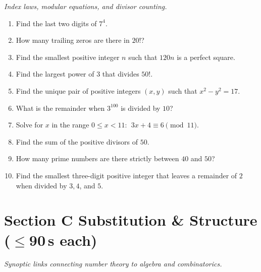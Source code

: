 \documentclass[11pt,a4paper]{article}
\begin{document}
\noindent\textit{Index laws, modular equations, and divisor counting.}

\begin{enumerate}

\item Find the last two digits of $7^4$.

\item How many trailing zeros are there in $20!$?

\item Find the smallest positive integer $n$ such that $120n$ is a perfect square.

\item Find the largest power of $3$ that divides $50!$.

\item Find the unique pair of positive integers $(x,y)$ such that $x^2 - y^2 = 17$.

\item What is the remainder when $3^{100}$ is divided by $10$?

\item Solve for $x$ in the range $0 \leq x < 11$: $\;3x + 4 \equiv 6 \pmod{11}$.

\item Find the sum of the positive divisors of $50$.

\item How many prime numbers are there strictly between $40$ and $50$?

\item Find the smallest three-digit positive integer that leaves a remainder of $2$ when divided by $3, 4$, and $5$.

\end{enumerate}

\section*{Section C \quad Substitution \& Structure \hfill{\normalfont\small($\leq$90\,s each)}}

\noindent\textit{Synoptic links connecting number theory to algebra and combinatorics.}
\end{document}
